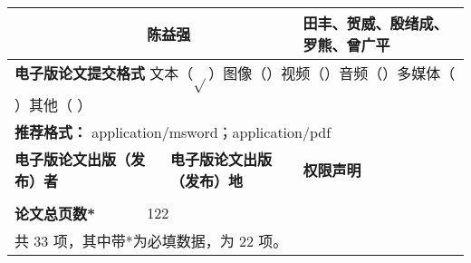 \begin{table}[htbp]
{\begin{tabularx}{1.1\textwidth}{|X|X|X|X|X|}
   & \multicolumn{2}{|l|}{陈益强}    & \multicolumn{2}{|l|}{田丰、贺威、殷绪成、罗熊、曾广平} \\
\hline
\multicolumn{5}{|l|}{\textbf{电子版论文提交格式} \quad 文本（$\sqrt{ }$）图像（\quad）视频（\quad）音频（\quad）多媒体（ \quad ）其他（ \quad ）} \\
\multicolumn{5}{|l|}{\textbf{推荐格式：} application/msword；application/pdf} \\
\hline
\multicolumn{2}{|l|}{\textbf{电子版论文出版（发布）者}  } & \multicolumn{2}{|l|}{\textbf{电子版论文出版（发布）地}  } & \textbf{权限声明} \\ \hline
\multicolumn{2}{|l|}{} & \multicolumn{2}{|l|}{} & \\
\hline
\textbf{论文总页数*} & \multicolumn{4}{|l|}{122} \\ \hline
\multicolumn{5}{|l|}{共 33 项，其中带*为必填数据，为 22 项。} \\
\hline
\end{tabularx}}
\end{table}

